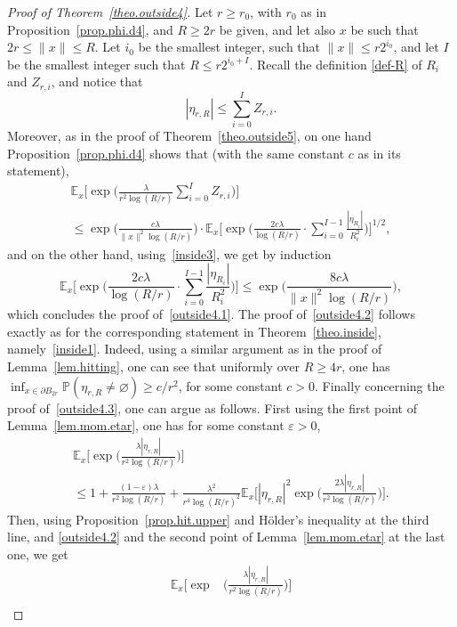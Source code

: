 \documentclass[11pt]{article}
\numberwithin{equation}{section}
\let\ts\textstyle
\theoremstyle{plain}
\theoremstyle{definition}
\newcommand{\1}{{\text{\Large $\mathfrak 1$}}}
\begin{document}
\begin{proof}[Proof of Theorem~\ref{theo.outside4}]
Let $r\ge r_0$, with $r_0$ as in Proposition~\ref{prop.phi.d4}, and $R\ge 2r$ be given, and let also $x$ be such
that $2r\le \|x\|\le R$. Let $i_0$ be the smallest integer,
such that $\|x\|\le r2^{i_0}$,
and let $I$ be the smallest integer such that $R\le r2^{i_0+I}$.
Recall the definition \eqref{def-R} of $R_i$ and $Z_{r,i}$, and notice that
\[
|\eta_{r,R}| \le \sum_{i=0}^I Z_{r,i}.
\]
Moreover, as in the proof of Theorem~\ref{theo.outside5}, on one hand Proposition~\ref{prop.phi.d4} shows that (with the same constant $c$ as in its statement),
\begin{multline*}
\mathbb E_x\Big[\exp\Big(\frac{\lambda}{r^2\log(R/r)}
{\ts\sum_{i=0}^I} Z_{r,i}\Big)\Big]\\
\le\exp\Big(\frac{c\lambda}{\|x\|^2\log(R/r)}\Big)
\cdot \mathbb E_x\Big[ \exp\Big(\frac{2c\lambda}{\log(R/r)}
\cdot {\ts\sum_{i=0}^{I-1}} \frac{ |\eta_{R_i}|}{R_i^2}\Big)\Big]^{1/2},
\end{multline*}
and on the other hand, using~\eqref{inside3}, we get by induction
\[
\mathbb E_x\Big[ \exp\Big(\frac{2c\lambda}{\log(R/r)}\cdot {\ts\sum_{i=0}^{I-1}}
\frac{ |\eta_{R_i}|}{R_i^2}\Big)\Big]
\le \exp\Big(\frac{8c\lambda}{\|x\|^2 \log(R/r)}\Big),
\]
which concludes the proof of~\eqref{outside4.1}. The proof of~\eqref{outside4.2} follows exactly as for the corresponding statement
in Theorem~\ref{theo.inside}, namely~\eqref{inside1}. Indeed, using a similar argument as in the proof of Lemma~\ref{lem.hitting},
one can see that uniformly over $R\ge 4r$, one has $\inf_{x\in \partial B_{2r}} \mathbb P(\eta_{r,R}\neq \varnothing) \ge c/r^2$, for some constant $c>0$. Finally concerning the proof of~\eqref{outside4.3},
one can argue as follows. First using the first point of Lemma~\ref{lem.mom.etar}, one has for some constant $\varepsilon>0$,
\begin{multline*}
\mathbb E_x\Big[\exp\Big(\frac{\lambda|\eta_{r,R}|}{r^2\log(R/r)}\Big)\Big]\\
\le 1+\frac{(1-\varepsilon)\lambda}{r^2\log(R/r)} + \frac{\lambda^2}{r^4\log(R/r)^2}
\mathbb E_x\Big[|\eta_{r,R}|^2\exp\Big(\frac{2\lambda|\eta_{r,R}|}{r^2\log(R/r)}\Big)\Big].
\end{multline*}
Then, using Proposition~\ref{prop.hit.upper} and Hölder's inequality at the third line, and \eqref{outside4.2} and the second point of Lemma~\ref{lem.mom.etar} at the last one, we get
\begin{align*}
\mathbb E_x\Big[\exp&\Big(\frac{\lambda|\eta_{r,R}|}{r^2\log(R/r)}\Big)\Big]\\

\end{align*}
\end{proof}
\end{document}
